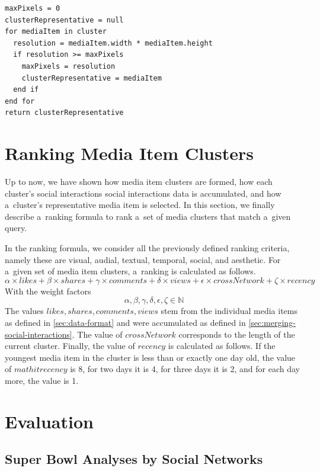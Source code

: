 \begin{lstlisting}[caption=Pseudocode of the cluster representative selection algorithm,
  label=code:clusterrepresentative, float]
maxPixels = 0
clusterRepresentative = null
for mediaItem in cluster
  resolution = mediaItem.width * mediaItem.height
  if resolution >= maxPixels
    maxPixels = resolution
    clusterRepresentative = mediaItem
  end if  
end for
return clusterRepresentative     
\end{lstlisting}

\section{Ranking Media Item Clusters}
\label{sec:ranking-media-item-clusters}

Up to now, we have shown how media item clusters are formed,
how each cluster's social interactions social interactions data is accumulated,
and how a~cluster's representative media item is selected.
In this section, we finally describe a~ranking formula to rank
a~set of media clusters that match a~given query.

In the ranking formula, we consider all the previously defined ranking criteria,
namely these are visual, audial, textual, temporal, social, and aesthetic.
For a~given set of media item clusters, a~ranking is calculated as follows.
$$ \alpha \times \mathit{likes} + \beta \times \mathit{shares} +
\gamma \times \mathit{comments} + \delta \times \mathit{views} +
\epsilon \times \mathit{crossNetwork} + \zeta \times \mathit{recency} $$
With the weight factors
$$ \alpha, \beta, \gamma, \delta, \epsilon, \zeta \in \mathbb{N} $$
The values $ \mathit{likes}, \mathit{shares}, \mathit{comments}, \mathit{views} $
stem from the individual media items as defined in \autoref{sec:data-format} and 
were accumulated as defined in \autoref{sec:merging-social-interactions}.
The value of $ \mathit{crossNetwork} $ corresponds to the length of the current cluster. 
Finally, the value of $ \mathit{recency} $ is calculated as follows.
If the youngest media item in the cluster is less than or exactly one day old, the value of
$ mathit{recency} $ is 8, for two days it is 4, for three days it is 2, and for each day more, the value is 1.

\section{Evaluation}

\subsection{Super Bowl Analyses by Social Networks}

